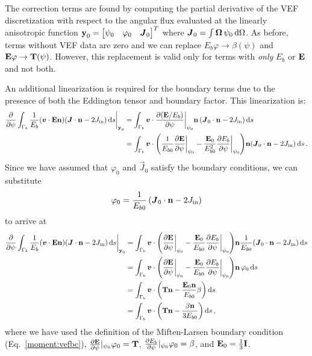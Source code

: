 \documentclass[../doc.tex]{subfiles}
\begin{document}
The correction terms are found by computing the partial derivative of the VEF discretization with respect to the angular flux evaluated at the linearly anisotropic function $\boldsymbol{\mathrm{y}}_0 = \begin{bmatrix} \psi_0 & \varphi_0 & \boldsymbol{J}_0 \end{bmatrix}^T$ where $\boldsymbol{J}_0 = \int \boldsymbol{\Omega}\,\psi_0 \mathop{}\!\mathrm{d} \Omega$. As before, terms without VEF data are zero and we can replace $E_b\varphi \rightarrow \beta(\psi)$ and $\boldsymbol{\mathrm{E}}\varphi \rightarrow \boldsymbol{\mathrm{T}}(\psi)$. However, this replacement is valid only for terms with \emph{only} $E_b$ or $\boldsymbol{\mathrm{E}}$ and not both. 

An additional linearization is required for the boundary terms due to the presence of both the Eddington tensor and boundary factor. This linearization is: 
	\begin{equation}
	\begin{aligned}
		\frac{\partial }{\partial \psi}\int_{\Gamma_b} \frac{1}{E_b}\!\left( \boldsymbol{v}\cdot\boldsymbol{\mathrm{E}}\boldsymbol{\mathrm{n}} \right)\!\left( \boldsymbol{J}\cdot\boldsymbol{\mathrm{n}} - 2J_\text{in} \right) \mathop{}\!\mathrm{d} s \biggr\rvert_{\boldsymbol{\mathrm{y}}_0} &= \int_{\Gamma_b} \boldsymbol{v}\cdot\frac{\partial (\boldsymbol{\mathrm{E}}/E_b)}{\partial \psi}\biggr\rvert_{\psi_0}\boldsymbol{\mathrm{n}}\left( \boldsymbol{J}_0\cdot\boldsymbol{\mathrm{n}} - 2J_\text{in} \right) \mathop{}\!\mathrm{d} s \\
		&= \int_{\Gamma_b} \boldsymbol{v} \cdot \left( \frac{1}{E_{b0}}\frac{\partial \boldsymbol{\mathrm{E}}}{\partial \psi}\biggr\rvert_{\psi_0} - \frac{\boldsymbol{\mathrm{E}}_0}{E_{b0}^2}\frac{\partial E_b}{\partial \psi}\biggr\rvert_{\psi_0} \right)\!\boldsymbol{\mathrm{n}}\!\left( \boldsymbol{J}_0\cdot\boldsymbol{\mathrm{n}} - 2J_\text{in} \right) \mathop{}\!\mathrm{d} s \,. 
	\end{aligned}
	\end{equation}
Since we have assumed that $\varphi_0$ and $\vec{J}_0$ satisfy the boundary conditions, we can substitute 
	\begin{equation}
		\varphi_0 = \frac{1}{E_{b0}}\left( \boldsymbol{J}_0\cdot\boldsymbol{\mathrm{n}} - 2J_\text{in} \right) 
	\end{equation}
to arrive at 
	\begin{equation}
	\begin{aligned}
		\pderiv{}{\psi}\int_{\Gamma_b} \frac{1}{E_b}\!\paren{\vec{v}\cdot\E\n}\!\paren{\vec{J}\cdot\n - 2\Jin} \ud s \biggr\rvert_{\y_0} &= \int_{\Gamma_b} \vec{v}\cdot\paren{\pderiv{\E}{\psi}\biggr\rvert_{\psi_0} - \frac{\E_0}{E_{b0}} \pderiv{E_b}{\psi}\biggr\rvert_{\psi_0}}\!\n \frac{1}{E_{b0}}\!\paren{\vec{J}_0\cdot\n - 2\Jin} \ud s \\
		&= \int_{\Gamma_b} \vec{v}\cdot\paren{\pderiv{\E}{\psi}\biggr\rvert_{\psi_0} - \frac{\E_0}{E_{b0}} \pderiv{E_b}{\psi}\biggr\rvert_{\psi_0}}\!\n\,\varphi_0 \ud s \\
		&= \int_{\Gamma_b} \vec{v}\cdot\paren{\T\n - \frac{\E_0\n}{E_{b0}}\beta} \ud s \\
		&= \int_{\Gamma_b} \vec{v}\cdot\paren{\T\n - \frac{\beta\n}{3E_{b0}}} \ud s \,, 
	\end{aligned}
	\end{equation}
where we have used the definition of the Miften-Larsen boundary condition (Eq.~\ref{moment:vefbc}), $\frac{\partial \boldsymbol{\mathrm{E}}}{\partial \psi}\rvert_{\psi_0}\varphi_0 = \boldsymbol{\mathrm{T}}$, $\frac{\partial E_b}{\partial \psi}\rvert_{\psi_0}\varphi_0 = \beta$, and $\boldsymbol{\mathrm{E}}_0 = \frac{1}{3}\boldsymbol{\mathrm{I}}$. 
\end{document}
